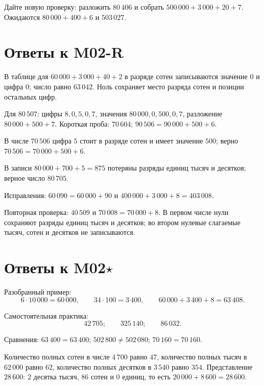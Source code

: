 \begin{teacherbox}
  Дайте новую проверку: разложить \(80\,406\) и собрать
  \(500\,000+3\,000+20+7\). Ожидаются
  \(80\,000+400+6\) и \(503\,027\).
\end{teacherbox}

\newpage
\section{Ответы к M02-R}

\begin{teacherbox}
  В таблице для \(60\,000+3\,000+40+2\) в разряде сотен записываются значение
  \(0\) и цифра \(0\); число равно \(63\,042\). Ноль сохраняет место разряда
  сотен и позиции остальных цифр.

  Для \(80\,507\): цифры \(8,0,5,0,7\), значения
  \(80\,000,0,500,0,7\), разложение \(80\,000+500+7\).
  Короткая проба: \(70\,604\); \(90\,506=90\,000+500+6\).
\end{teacherbox}

\begin{teacherbox}
  В числе \(70\,506\) цифра \(5\) стоит в разряде сотен и имеет значение
  \(500\); верно \(70\,506=70\,000+500+6\).

  В записи \(80\,000+700+5=875\) потеряны разряды единиц тысяч и десятков;
  верное число \(80\,705\).

  Исправления: \(60\,090=60\,000+90\) и
  \(400\,000+3\,000+8=403\,008\).

  Повторная проверка: \(40\,509\) и
  \(70\,008=70\,000+8\). В первом числе нули сохраняют разряды единиц тысяч
  и десятков; во втором нулевые слагаемые тысяч, сотен и десятков не
  записываются.
\end{teacherbox}

\newpage
\section{Ответы к M02\(\star\)}

\begin{teacherbox}
  Разобранный пример:
  \[
    6\cdot10\,000=60\,000,\qquad
    34\cdot100=3\,400,\qquad
    60\,000+3\,400+8=63\,408.
  \]

  Самостоятельная практика:
  \[
    42\,705;\qquad 325\,140;\qquad 86\,032.
  \]
\end{teacherbox}

\begin{teacherbox}
  Сравнения: \(63\,400=63\,400\); \(502\,800\ne502\,080\);
  \(70\,160=70\,160\).

  Количество полных сотен в числе \(4\,700\) равно \(47\), количество полных
  тысяч в \(62\,000\) равно \(62\), количество полных десятков в \(3\,540\)
  равно \(354\).
  Представление \(28\,600\): \(2\) десятка тысяч, \(86\) сотен и \(0\)
  единиц, то есть \(20\,000+8\,600=28\,600\).
\end{teacherbox}

